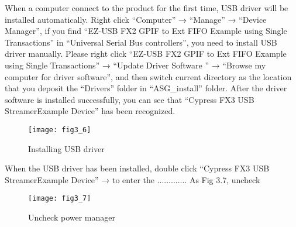 When a computer connect to the product for the first time, USB driver will be installed automatically. Right click “Computer” → “Manage” → “Device Manager”, if you find “EZ-USB FX2 GPIF to Ext FIFO Example using Single Transactions” in “Universal Serial Bus controllers”, you need to install USB driver manually. Please right click “EZ-USB FX2 GPIF to Ext FIFO Example using Single Transactions” → “Update Driver Software ” → “Browse my computer for driver software”, and then switch current directory as the location that you deposit the “Drivers” folder in “ASG\_install” folder. After the driver software is installed successfully, you can see that “Cypress FX3 USB StreamerExample Device” has been recognized.
\begin{figure}[htbp]
\centering
\texttt{[image: fig3\_6]}
\caption{Installing USB driver}
\end{figure}

When the USB driver has been installed, double click “Cypress FX3 USB StreamerExample Device”  →  to enter the ............. As Fig 3.7, uncheck
\begin{figure}[htbp]
\centering
\texttt{[image: fig3\_7]}
\caption{Uncheck power manager}
\end{figure}




